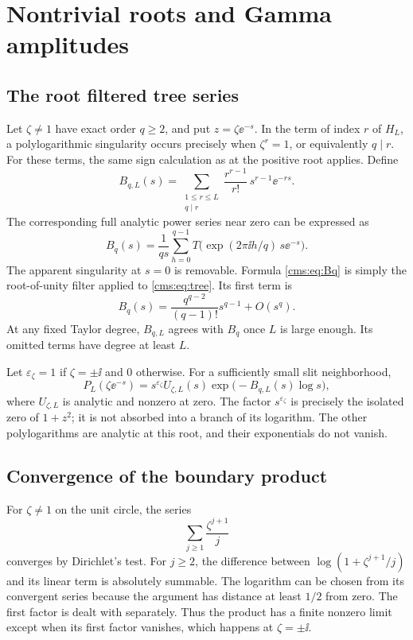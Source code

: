 \section{Nontrivial roots and Gamma amplitudes}\label{cms:sec:roots}
\subsection{The root filtered tree series}
Let $\zeta\ne1$ have exact order $q\geq2$, and put $z=\zeta\ee^{-s}$. In the term of index $r$ of $H_L$, a polylogarithmic singularity occurs precisely when $\zeta^r=1$, or equivalently $q\mid r$. For these terms, the same sign calculation as at the positive root applies. Define
\begin{equation}\label{cms:eq:BqL}
B_{q,L}(s)=\sum_{\substack{1\leq r\leq L\\q\mid r}}
\frac{r^{r-1}}{r!}\,s^{r-1}\ee^{-rs}.
\end{equation}
The corresponding full analytic power series near zero can be expressed as
\begin{equation}\label{cms:eq:Bq}
B_q(s)=\frac1{qs}\sum_{h=0}^{q-1}
 T\bigl(\exp(2\pi\ii h/q)\,s\ee^{-s}\bigr).
\end{equation}
The apparent singularity at $s=0$ is removable. Formula \eqref{cms:eq:Bq} is simply the root-of-unity filter applied to \eqref{cms:eq:tree}. Its first term is
\begin{equation}\label{cms:eq:Bqfirst}
B_q(s)=\frac{q^{q-2}}{(q-1)!}s^{q-1}+O(s^q).
\end{equation}
At any fixed Taylor degree, $B_{q,L}$ agrees with $B_q$ once $L$ is large enough. Its omitted terms have degree at least $L$.

Let $\varepsilon_\zeta=1$ if $\zeta=\pm\ii$ and $0$ otherwise. For a sufficiently small slit neighborhood,
\begin{equation}\label{cms:eq:rootform}
P_L(\zeta\ee^{-s})=s^{\varepsilon_\zeta}U_{\zeta,L}(s)
 \exp\bigl(-B_{q,L}(s)\log s\bigr),
\end{equation}
where $U_{\zeta,L}$ is analytic and nonzero at zero. The factor $s^{\varepsilon_\zeta}$ is precisely the isolated zero of $1+z^2$; it is not absorbed into a branch of its logarithm. The other polylogarithms are analytic at this root, and their exponentials do not vanish.

\subsection{Convergence of the boundary product}
For $\zeta\ne1$ on the unit circle, the series
\[
\sum_{j\geq1}\frac{\zeta^{j+1}}j
\]
converges by Dirichlet's test. For $j\geq2$, the difference between $\log(1+\zeta^{j+1}/j)$ and its linear term is absolutely summable. The logarithm can be chosen from its convergent series because the argument has distance at least $1/2$ from zero. The first factor is dealt with separately. Thus the product has a finite nonzero limit except when its first factor vanishes, which happens at $\zeta=\pm\ii$.

